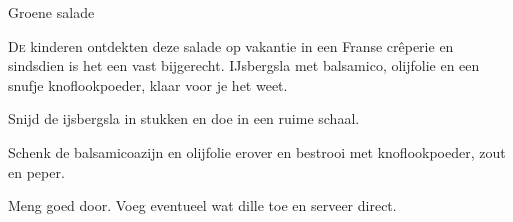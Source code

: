 \begin{recipe}{Groene salade}
\label{recipe:groene-salade}


\lettrine{D}{e} kinderen ontdekten deze salade op vakantie in een Franse crêperie
en sindsdien is het een vast bijgerecht. IJsbergsla met balsamico, olijfolie en
een snufje knoflookpoeder, klaar voor je het weet.

\begin{ingredients}
\end{ingredients}

\begin{steps}
  \item Snijd de ijsbergsla in stukken en doe in een ruime schaal.
  \item Schenk de balsamicoazijn en olijfolie erover en bestrooi met
        knoflookpoeder, zout en peper.
  \item Meng goed door. Voeg eventueel wat dille toe en serveer direct.
\end{steps}

\vspace{14pt}
\end{recipe}
